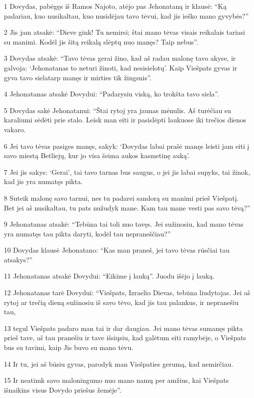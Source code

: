 \par 1 Dovydas, pabėgęs iš Ramos Najoto, atėjo pas Jehonataną ir klausė: “Ką padariau, kuo nusikaltau, kuo nusidėjau tavo tėvui, kad jis ieško mano gyvybės?” 
\par 2 Jis jam atsakė: “Dieve gink! Tu nemirsi; štai mano tėvas visais reikalais tariasi su manimi. Kodėl jis šitą reikalą slėptų nuo manęs? Taip nebus”. 
\par 3 Dovydas atsakė: “Tavo tėvas gerai žino, kad aš radau malonę tavo akyse, ir galvoja: ‘Jehonatanas to neturi žinoti, kad nesisielotų’. Kaip Viešpats gyvas ir gyva tavo siela­tarp manęs ir mirties tik žingsnis”. 
\par 4 Jehonatanas atsakė Dovydui: “Padarysiu viską, ko trokšta tavo siela”. 
\par 5 Dovydas sakė Jehonatanui: “Štai rytoj yra jaunas mėnulis. Aš turėčiau su karaliumi sėdėti prie stalo. Leisk man eiti ir pasislėpti laukuose iki trečios dienos vakaro. 
\par 6 Jei tavo tėvas pasiges manęs, sakyk: ‘Dovydas labai prašė manęs leisti jam eiti į savo miestą Betliejų, kur jo visa šeima aukos kasmetinę auką’. 
\par 7 Jei jis sakys: ‘Gerai’, tai tavo tarnas bus saugus, o jei jis labai supyks, tai žinok, kad jis yra numatęs pikta. 
\par 8 Suteik malonę savo tarnui, nes tu padarei sandorą su manimi prieš Viešpatį. Bet jei aš nusikaltau, tu pats nužudyk mane. Kam tau mane vesti pas savo tėvą?” 
\par 9 Jehonatanas atsakė: “Tebūna tai toli nuo tavęs. Jei sužinosiu, kad mano tėvas yra numatęs tau pikta daryti, kodėl tau nepraneščiau?” 
\par 10 Dovydas klausė Jehonatano: “Kas man praneš, jei tavo tėvas rūsčiai tau atsakys?” 
\par 11 Jehonatanas atsakė Dovydui: “Eikime į lauką”. Juodu išėjo į lauką. 
\par 12 Jehonatanas tarė Dovydui: “Viešpats, Izraelio Dievas, tebūna liudytojas. Jei aš rytoj ar trečią dieną sužinosiu iš savo tėvo, kad jis tau palankus, ir nepranešiu tau, 
\par 13 tegul Viešpats padaro man tai ir dar daugiau. Jei mano tėvas sumanęs pikta prieš tave, aš tau pranešiu ir tave išsiųsiu, kad galėtum eiti ramybėje, o Viešpats bus su tavimi, kaip Jis buvo su mano tėvu. 
\par 14 Ir tu, jei aš būsiu gyvas, parodyk man Viešpaties gerumą, kad nemirčiau. 
\par 15 Ir neatimk savo maloningumo nuo mano namų per amžius, kai Viešpats išnaikins visus Dovydo priešus žemėje”. 
